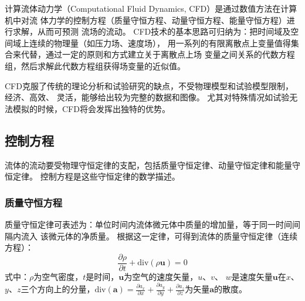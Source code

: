 计算流体动力学（Computational Fluid Dynamics, CFD）是通过数值方法在计算机中对流
体力学的控制方程（质量守恒方程、动量守恒方程、能量守恒方程）进行求解，从而可预测
流场的流动。
CFD技术的基本思路可归纳为：把时间域及空间域上连续的物理量（如压力场、速度场），
用一系列的有限离散点上变量值得集合来代替，通过一定的原则和方式建立关于离散点上场
变量之间关系的代数方程组，然后求解此代数方程组获得场变量的近似值。

CFD克服了传统的理论分析和试验研究的缺点，不受物理模型和试验模型限制，经济、高效、
灵活，能够给出较为完整的数据和图像。
尤其对特殊情况如试验无法模拟的时候，CFD将会发挥出独特的优势。

\subsection{控制方程}

流体的流动要受物理守恒定律的支配，包括质量守恒定律、动量守恒定律和能量守恒定律。
控制方程是这些守恒定律的数学描述。

\subsubsection{质量守恒方程}
质量守恒定律可表述为：单位时间内流体微元体中质量的增加量，等于同一时间间隔内流入
该微元体的净质量。
根据这一定律，可得到流体的质量守恒定律（连续方程）：
\begin{equation}
  \label{eq:continuity}
  \frac{\partial \rho}{\partial t} + \mathrm{div} (\rho \bm{u}) = 0
\end{equation}
式中：$ \rho $为空气密度，$ t $是时间，$ \bm{u} $为空气的速度矢量，$ u $、$ v $、
$ w $是速度矢量$ \bm{u} $在$ x $、$ y $、$ z $三个方向上的分量，$ \mathrm{div}
(\bm{a}) = \frac{\partial a_x }{\partial x } + \frac{\partial a_y }{\partial y }
+ \frac{\partial a_z  }{\partial z } $为矢量$ \bm{a} $的散度。

